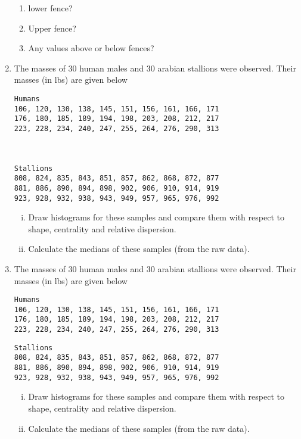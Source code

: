 \documentclass[]{report}
\begin{document}
\begin{enumerate}
\begin{center}
	\end{center}
	
	\begin{enumerate}
		\item lower fence?
		\item Upper fence?
		\item Any values above or below fences?
		
	\end{enumerate}
\item The masses of 30 human males and 30 arabian stallions were observed. Their masses (in lbs) are given below

\begin{verbatim}
Humans
106, 120, 130, 138, 145, 151, 156, 161, 166, 171
176, 180, 185, 189, 194, 198, 203, 208, 212, 217
223, 228, 234, 240, 247, 255, 264, 276, 290, 313



Stallions
808, 824, 835, 843, 851, 857, 862, 868, 872, 877
881, 886, 890, 894, 898, 902, 906, 910, 914, 919
923, 928, 932, 938, 943, 949, 957, 965, 976, 992
\end{verbatim}

\begin{enumerate}[(i)]
	\item Draw histograms for these samples and compare them with respect to shape, centrality and relative dispersion. 
	\item Calculate the medians of these samples (from the raw data).
\end{enumerate}
\item
The masses of 30 human males and 30 arabian stallions were observed. Their masses (in lbs) are given below

\begin{verbatim}
Humans
106, 120, 130, 138, 145, 151, 156, 161, 166, 171
176, 180, 185, 189, 194, 198, 203, 208, 212, 217
223, 228, 234, 240, 247, 255, 264, 276, 290, 313
\end{verbatim}



\begin{verbatim}
Stallions
808, 824, 835, 843, 851, 857, 862, 868, 872, 877
881, 886, 890, 894, 898, 902, 906, 910, 914, 919
923, 928, 932, 938, 943, 949, 957, 965, 976, 992
\end{verbatim}


\begin{enumerate}[(i)]
	\item Draw histograms for these samples and compare them with respect to shape, centrality and relative dispersion. 
	\item Calculate the medians of these samples (from the raw data).
\end{enumerate}


\end{enumerate}
\end{document}
